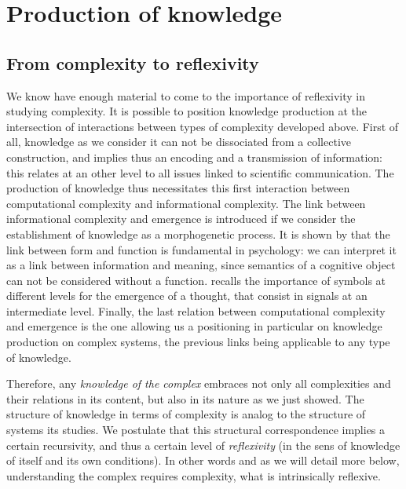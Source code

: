 \section{Production of knowledge}

\subsection{From complexity to reflexivity}

We know have enough material to come to the importance of reflexivity in studying complexity. It is possible to position knowledge production at the intersection of interactions between types of complexity developed above. First of all, knowledge as we consider it can not be dissociated from a collective construction, and implies thus an encoding and a transmission of information: this relates at an other level to all issues linked to scientific communication. The production of knowledge thus necessitates this first interaction between computational complexity and informational complexity. The link between informational complexity and emergence is introduced if we consider the establishment of knowledge as a morphogenetic process. It is shown by \cite{antelope2016interdisciplinary} that the link between form and function is fundamental in psychology: we can interpret it as a link between information and meaning, since semantics of a cognitive object can not be considered without a function. \cite{hofstadter1980godel} recalls the importance of symbols at different levels for the emergence of a thought, that consist in signals at an intermediate level. Finally, the last relation between computational complexity and emergence is the one allowing us a positioning in particular on knowledge production on complex systems, the previous links being applicable to any type of knowledge.

Therefore, any \emph{knowledge of the complex} embraces not only all complexities and their relations in its content, but also in its nature as we just showed. The structure of knowledge in terms of complexity is analog to the structure of systems its studies. We postulate that this structural correspondence implies a certain recursivity, and thus a certain level of \emph{reflexivity} (in the sens of knowledge of itself and its own conditions). In other words and as we will detail more below, understanding the complex requires complexity, what is intrinsically reflexive.


%

